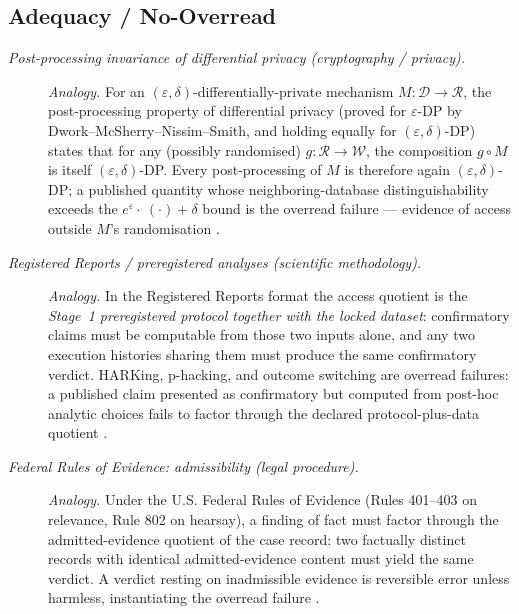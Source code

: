 \subsection*{ Adequacy / No-Overread}
\begingroup\small
\begin{description}
\item[\emph{Post-processing invariance of differential privacy
(cryptography / privacy).}] \textit{Analogy.}
For an \((\varepsilon,\delta)\)-differentially-private mechanism
\(M:\mathcal D\to\mathcal R\), the post-processing property of differential privacy (proved for \(\varepsilon\)-DP by Dwork--McSherry--Nissim--Smith, and holding equally for \((\varepsilon,\delta)\)-DP) states that for any (possibly
randomised) \(g:\mathcal R\to\mathcal W\), the composition
\(g\circ M\) is itself \((\varepsilon,\delta)\)-DP.  Every post-processing
of \(M\) is therefore again \((\varepsilon,\delta)\)-DP; a published quantity whose
neighboring-database distinguishability exceeds the
\(e^{\varepsilon}\!\cdot\!\!\ (\cdot)+\delta\) bound is the
overread failure --- evidence of access outside \(M\)'s
randomisation
\citep{DworkMcSherryNissimSmith2006CalibratingNoise}.

\item[\emph{Registered Reports / preregistered analyses (scientific
methodology).}] \textit{Analogy.}
In the Registered Reports format the access quotient is the
\emph{Stage~1 preregistered protocol together with the locked
dataset}: confirmatory claims must be computable from those two
inputs alone, and any two execution histories sharing them must
produce the same confirmatory verdict.  HARKing, p-hacking, and
outcome switching are overread failures: a published claim
presented as confirmatory but computed from post-hoc analytic
choices fails to factor through the declared protocol-plus-data
quotient
\citep{Chambers2013RegisteredReports}.

\item[\emph{Federal Rules of Evidence: admissibility (legal
procedure).}] \textit{Analogy.}
Under the U.S. Federal Rules of Evidence (Rules 401--403 on
relevance, Rule 802 on hearsay), a finding of fact must factor
through the admitted-evidence quotient of the case record: two
factually distinct records with identical admitted-evidence content
must yield the same verdict.  A verdict resting on inadmissible
evidence is reversible error unless harmless, instantiating the
 overread failure
\citep{FRE2024FederalRulesEvidence}.


\end{description}
